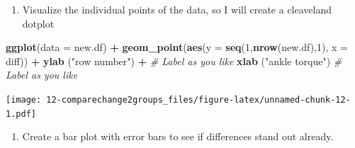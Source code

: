 \documentclass[
]{book}
\newenvironment{Shaded}{\begin{snugshade}}{\end{snugshade}}
\newcommand{\CommentTok}[1]{\textcolor[rgb]{0.56,0.35,0.01}{\textit{#1}}}
\newcommand{\DataTypeTok}[1]{\textcolor[rgb]{0.13,0.29,0.53}{#1}}
\newcommand{\DecValTok}[1]{\textcolor[rgb]{0.00,0.00,0.81}{#1}}
\newcommand{\KeywordTok}[1]{\textcolor[rgb]{0.13,0.29,0.53}{\textbf{#1}}}
\newcommand{\NormalTok}[1]{#1}
\newcommand{\OperatorTok}[1]{\textcolor[rgb]{0.81,0.36,0.00}{\textbf{#1}}}
\newcommand{\StringTok}[1]{\textcolor[rgb]{0.31,0.60,0.02}{#1}}
\providecommand{\tightlist}{%
  \setlength{\itemsep}{0pt}\setlength{\parskip}{0pt}}
\begin{document}
\begin{enumerate}
\def\labelenumi{\arabic{enumi}.}
\setcounter{enumi}{6}
\tightlist
\item
  Visualize the individual points of the data, so I will create a cleaveland dotplot
\end{enumerate}

\begin{Shaded}
\begin{Highlighting}[]
\KeywordTok{ggplot}\NormalTok{(}\DataTypeTok{data =}\NormalTok{ new.df) }\OperatorTok{+}\StringTok{ }
\StringTok{  }\KeywordTok{geom_point}\NormalTok{(}\KeywordTok{aes}\NormalTok{(}\DataTypeTok{y =} \KeywordTok{seq}\NormalTok{(}\DecValTok{1}\NormalTok{,}\KeywordTok{nrow}\NormalTok{(new.df),}\DecValTok{1}\NormalTok{), }\DataTypeTok{x =}\NormalTok{ diff)) }\OperatorTok{+}
\StringTok{  }\KeywordTok{ylab}\NormalTok{ (}\StringTok{"row number"}\NormalTok{) }\OperatorTok{+}\StringTok{ }\CommentTok{# Label as you like}
\StringTok{  }\KeywordTok{xlab}\NormalTok{ (}\StringTok{"ankle torque"}\NormalTok{) }\CommentTok{# Label as you like}
\end{Highlighting}
\end{Shaded}

\texttt{[image: 12-comparechange2groups\_files/figure-latex/unnamed-chunk-12-1.pdf]}

\begin{enumerate}
\def\labelenumi{\arabic{enumi}.}
\setcounter{enumi}{7}
\tightlist
\item
  Create a bar plot with error bars to see if differences stand out already.
\end{enumerate}

\begin{Shaded}
\end{Shaded}
\end{document}
